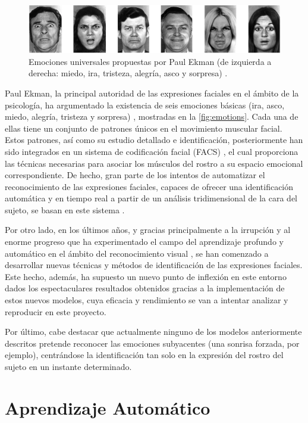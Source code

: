 \begin{figure}
    \centering
    \includegraphics[width=\textwidth]{Images/emotions.png}
    \caption{Emociones universales propuestas por Paul Ekman (de izquierda a derecha: miedo, ira, tristeza, alegría, asco y sorpresa) \cite{Ekman}.}
    \label{fig:emotions}
\end{figure}

Paul Ekman, la principal autoridad de las expresiones faciales en el ámbito de la psicología, ha argumentado la existencia de seis emociones básicas  (ira, asco, miedo, alegría, tristeza y sorpresa) \cite{Ekman}, mostradas en la \autoref{fig:emotions}. Cada una de ellas tiene un conjunto de patrones únicos en el movimiento muscular facial. Estos patrones, así como su estudio detallado e identificación, posteriormente han sido integrados en un sistema de codificación facial (FACS) \cite{FACS}, el cual proporciona las técnicas necesarias para asociar los músculos del rostro a su espacio emocional correspondiente. De hecho, gran parte de los intentos de automatizar el reconocimiento de las expresiones faciales, capaces de ofrecer una identificación automática y en tiempo real a partir de un análisis tridimensional de la cara del sujeto, se basan en este sistema \cite{FaceReader}.

Por otro lado, en los últimos años, y gracias principalmente a la irrupción y al enorme progreso que ha experimentado el campo del aprendizaje profundo y automático en el ámbito del reconocimiento visual \cite{DeepLearning}, se han comenzado a desarrollar nuevas técnicas y métodos de identificación de las expresiones faciales. Este hecho, además, ha supuesto un nuevo punto de inflexión en este entorno dados los espectaculares resultados obtenidos gracias a la implementación de estos nuevos modelos, cuya eficacia y rendimiento se van a intentar analizar y reproducir en este proyecto.

Por último, cabe destacar que actualmente ninguno de los modelos anteriormente descritos pretende reconocer las emociones subyacentes (una sonrisa forzada, por ejemplo), centrándose la identificación tan solo en la expresión del rostro del sujeto en un instante determinado.

\section{Aprendizaje Automático}

